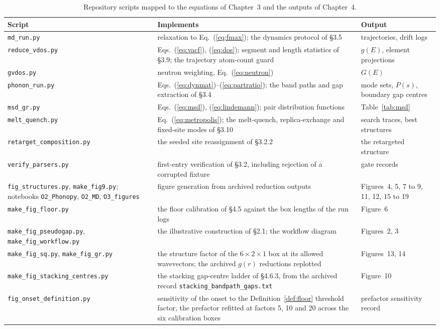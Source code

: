 \begin{table}[H]
\centering
\caption[Repository code mapped to the equations implemented]{Repository
scripts mapped to the equations of Chapter~3 and the outputs of Chapter~4.}
\label{tab:codemap}
\small
\begin{tabular}{p{}p{}p{}}
\toprule
Script & Implements & Output \\
\midrule
\texttt{md\_run.py} & relaxation to Eq.~(\ref{eq:fmax}); the dynamics
  protocol of \S3.5 & trajectories, drift logs \\
\texttt{reduce\_vdos.py} & Eqs.~(\ref{eq:vacf}), (\ref{eq:dos}); segment
  and length statistics of \S3.9; the trajectory atom-count guard &
  $g(E)$, element projections \\
\texttt{gvdos.py} & neutron weighting, Eq.~(\ref{eq:neutron}) & $G(E)$ \\
\texttt{phonon\_run.py} & Eqs.~(\ref{eq:dynmat})--(\ref{eq:partratio});
  the band paths and gap extraction of \S3.4 & mode sets, $P(s)$,
  boundary gap centres \\
\texttt{msd\_gr.py} & Eqs.~(\ref{eq:msd}), (\ref{eq:lindemann}); pair
  distribution functions & Table~\ref{tab:msd} \\
\texttt{melt\_quench.py} & Eq.~(\ref{eq:metropolis}); the melt-quench,
  replica-exchange and fixed-site modes of \S3.10 & search traces, best
  structures \\
\texttt{retarget\_composition.py} & the seeded site reassignment of
  \S3.2.2 & the retargeted structure \\
\texttt{verify\_parsers.py} & first-entry verification of \S3.2,
  including rejection of a corrupted fixture & gate records \\
\texttt{fig\_structures.py}, \texttt{make\_fig9.py}; notebooks
  \texttt{O2\_Phonopy}, \texttt{O2\_MD}, \texttt{O3\_figures} & figure
  generation from archived reduction outputs & Figures~4, 5, 7 to 9, 11,
  12, 15 to 19 \\
\texttt{make\_fig\_floor.py} & the floor calibration of \S4.5 against
  the box lengths of the run logs & Figure~6 \\
\texttt{make\_fig\_pseudogap.py}, \texttt{make\_fig\_workflow.py} &
  the illustrative construction of \S2.1; the workflow diagram &
  Figures~2, 3 \\
\texttt{make\_fig\_sq.py}, \texttt{make\_fig\_gr.py} & the structure
  factor of the $6\times2\times1$ box at its allowed wavevectors; the
  archived $g(r)$ reductions replotted & Figures~13, 14 \\
\texttt{make\_fig\_stacking\_}\allowbreak\texttt{centres.py} & the stacking gap-centre
  ladder of \S4.6.3, from the archived record
  \texttt{stacking\_bandpath\_gaps.txt} & Figure~10 \\
\texttt{fig\_onset\_definition.py} & sensitivity of the onset to the
  Definition~\ref{def:floor} threshold factor, the prefactor refitted at
  factors 5, 10 and 20 across the six calibration boxes & prefactor
  sensitivity record \\
\bottomrule
\end{tabular}
\end{table}
\clearpage


